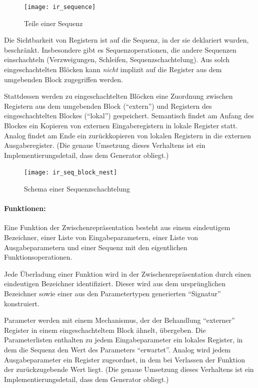 \documentclass[twoside,a4paper,fleqn,12pt]{article}
\begin{document}
\begin{figure}[h]
   \centering
  \texttt{[image: ir\_sequence]}
  \caption{Teile einer Sequenz}
  \label{fig:ir_sequence}
\end{figure}

Die Sichtbarkeit von Registern ist auf die Sequenz, in der sie deklariert wurden, beschränkt.
Insbesondere gibt es Sequenzoperationen, die andere Sequenzen einschachteln (Verzweigungen, Schleifen, Sequenzschachtelung).
Aus solch eingeschachtelten Blöcken kann \emph{nicht} implizit auf die Register aus dem umgebenden Block
zugegriffen werden.

Stattdessen werden zu eingeschachtelten Blöcken eine Zuordnung zwischen Registern aus dem umgebenden Block
("`extern"') und
Registern des eingeschachtelten Blockes ("`lokal"') gespeichert.
Semantisch findet am Anfang des Blockes ein Kopieren von externen Eingaberegistern
in lokale Register statt. Analog findet am Ende ein zurückkopieren von lokalen Registern in die externen Ausgaberegister.
(Die genaue Umsetzung dieses Verhaltens ist ein Implementierungsdetail, dass dem Generator obliegt.)

\begin{figure}[h]
   \centering
  \texttt{[image: ir\_seq\_block\_nest]}
  \caption{Schema einer Sequenzschachtelung}
  \label{fig:ir_seq_block_nest}
\end{figure}

\paragraph{Funktionen:}
Eine Funktion der Zwischenrepräsentation besteht aus einem eindeutigem Bezeichner, einer Liste von Eingabeparametern,
einer Liste von Ausgabeparametern und einer Sequenz mit den eigentlichen Funktionsoperationen.

Jede Überladung einer Funktion wird in der Zwischenrepräsentation durch einen eindeutigen Bezeichner identifiziert.
Dieser wird aus dem ursprünglichen Bezeichner sowie einer aus den Parametertypen generierten "`Signatur"' konstruiert.

Parameter werden mit einem Mechanismus, der der Behandlung "`externer"' Register in einem eingeschachteltem
Block ähnelt, übergeben. Die Parameterlisten enthalten zu jedem Eingabeparameter ein lokales Register, in dem die
Sequenz den Wert des Parameters "`erwartet"'. Analog wird jedem Ausgabeparameter ein Register zugeordnet,
in dem bei Verlassen der Funktion der zurückzugebende Wert liegt.
(Die genaue Umsetzung dieses Verhaltens ist ein Implementierungsdetail, dass dem Generator obliegt.)
\end{document}
